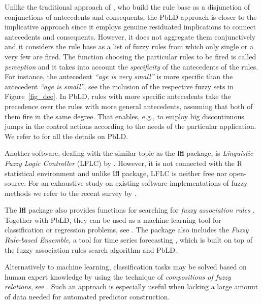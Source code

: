 \documentclass[review]{elsarticle}
\newcommand{\pkg}[1]{\textbf{#1}}
\newcommand{\proglang}[1]{#1}
\newcommand{\R}{\proglang{R}}
\begin{document}
Unlike the traditional approach of \cite{MamdaniAssilian75}, who build the
rule base as a disjunction of conjunctions of antecedents and consequents, the PbLD approach is
closer to the implicative approach \citep{Jones2009, Step_etal_continuity} since it employs genuine residuated implications to connect antecedents and consequents. However, it does not aggregate them conjunctively and it considers the rule base as a list of fuzzy rules from which only single or a very few are fired. The function choosing the particular rules to be fired is called \emph{perception} and it takes into account the  \emph{specificity} of the antecedents of the rules.
For instance, the antecedent \emph{``age is very small''} is more specific than the antecedent \emph{``age is small''}, see the inclusion of the respective fuzzy sets in Figure~\ref{fig_dee}. 
In PbLD, rules with more specific antecedents take the precedence over the rules with more general antecedents, assuming that both of them fire in the same degree. That enables, e.g., to employ big discontinuous jumps in the control actions according to the needs of the particular
application. We refer to \cite{Novak:PbLD,DvoStep:PbLD2015} for all the details on PbLD.



Another software, dealing with the
similar topic as the \pkg{lfl} package, is \emph{Linguistic Fuzzy Logic Controller} (LFLC) by \cite{dvo:lflc}.
However, it is not connected with the \R{} statistical environment and unlike \pkg{lfl} package, LFLC is neither free nor open-source. For an exhaustive study on existing software implementations of fuzzy methods we refer to the recent survey by \cite{AlcalAlonso:fuzzySW_IEEETFS16}.


The \pkg{lfl} package also provides functions for searching for \emph{fuzzy association rules} \citep{srikant95}. Together
with PbLD, they can be used as a machine learning tool for classification or regression problems, see \cite{KupkaRusnok:Regression_ESWA_INS17}.
The package also includes the \emph{Fuzzy Rule-based Ensemble}, a tool for time series forecasting
\citep{StepBurda:FRBE_FSS}, which is built on top of the fuzzy association rules search algorithm and PbLD.

Alternatively to machine learning, classification tasks may be solved based on human expert knowledge
by using the technique of \emph{compositions of fuzzy relations}, see \cite{Cao2017b,Cao2017,Step_etal:Unavoidable_KNOSYS2020}. Such an approach is especially useful when lacking a large amount of data needed for automated predictor construction.
\end{document}
